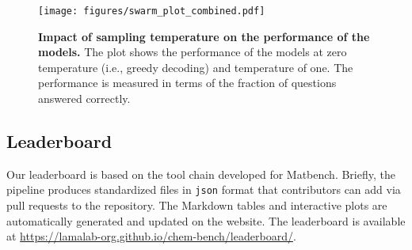 \begin{figure}[!h]
    \centering
    \texttt{[image: figures/swarm\_plot\_combined.pdf]}
    \caption{\textbf{Impact of sampling temperature on the performance of the models.} The plot shows the performance of the models at zero temperature (i.e., greedy decoding) and temperature of one. The performance is measured in terms of the fraction of questions answered correctly.}
    \label{fig:temperature_impact}
\end{figure}





\clearpage
\subsection{Leaderboard}
Our leaderboard is based on the tool chain developed for Matbench.\autocite{Dunn_2020}
Briefly, the \chembench pipeline produces standardized files in \texttt{json} format that contributors can add via pull requests to the \chembench repository.
The Markdown tables and interactive plots are automatically generated and updated on the \chembench website. The leaderboard is available at \url{https://lamalab-org.github.io/chem-bench/leaderboard/}.

\clearpage

\printnoidxglossary[type=\acronymtype, nonumberlist]  %
